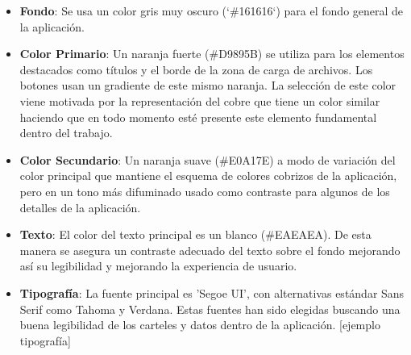\begin{itemize}
    \item \textbf{Fondo}: Se usa un color gris muy oscuro (`\#161616`) para el fondo general de la aplicación.
    \item \textbf{Color Primario}: Un naranja fuerte  (\#D9895B) se utiliza para los elementos destacados como títulos y el borde de la zona de carga de archivos. Los botones usan un gradiente de este mismo naranja. La selección de este color viene motivada por la representación del cobre que tiene un color similar haciendo que en todo momento esté presente este elemento fundamental dentro del trabajo.
\item \textbf{Color Secundario}: Un naranja suave (\#E0A17E) a modo de variación del color principal que mantiene el esquema de colores cobrizos de la aplicación, pero en un tono más difuminado usado como contraste para algunos de los detalles de la aplicación.

    \item \textbf{Texto}: El color del texto principal es un blanco (\#EAEAEA). De esta manera se asegura un contraste adecuado del texto sobre el fondo mejorando así su legibilidad y mejorando la experiencia de usuario.
    \item \textbf{Tipografía}: La fuente principal es 'Segoe UI', con alternativas estándar Sans Serif como Tahoma y Verdana. Estas fuentes han sido elegidas buscando una buena legibilidad de los carteles y datos dentro de la aplicación. [ejemplo tipografía]
\end{itemize}

